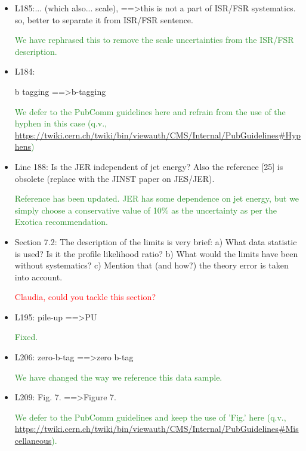 \documentclass[paper=a4, fontsize=11pt]{scrartcl}
\begin{document}
\begin{itemize}
\item L185:... (which also... scale), ==\textgreater this is not a part of ISR/FSR 
systematics. so, better to separate it from ISR/FSR sentence.

\textcolor{ForestGreen}{We have rephrased this to remove the scale uncertainties from the ISR/FSR description.}\\


\item L184: 

b tagging ==\textgreater b-tagging 

\textcolor{ForestGreen}{We defer to the PubComm guidelines here and refrain from the use of the hyphen
in this case (q.v., \url{https://twiki.cern.ch/twiki/bin/viewauth/CMS/Internal/PubGuidelines\#Hyphens})}\\


\item Line 188: 
Is the JER independent of jet energy? Also the reference [25] is obsolete 
(replace with the JINST paper on JES/JER). 

\textcolor{ForestGreen}{Reference has been updated. JER has some dependence on jet energy,
but we simply choose a conservative value of 10\% as the uncertainty as per the Exotica
recommendation.}\\

\item Section 7.2: 
The description of the limits is very brief: 
a) What data statistic is used? Is it the profile likelihood ratio? 
b) What would the limits have been without systematics? 
c) Mention that (and how?) the theory error is taken into account. 

\textcolor{Red}{Claudia, could you tackle this section?}\\

\item L195: 
pile-up ==\textgreater PU 

\textcolor{ForestGreen}{Fixed.}\\

\item L206: 
zero-b-tag ==\textgreater zero b-tag 

\textcolor{ForestGreen}{We have changed the way we reference this data sample.}\\


\item L209: 
Fig. 7. ==\textgreater Figure 7. 

\textcolor{ForestGreen}{We defer to the PubComm guidelines and keep the use of 'Fig.' here
(q.v., \url{https://twiki.cern.ch/twiki/bin/viewauth/CMS/Internal/PubGuidelines\#Miscellaneous}).}\\



\end{itemize}
\end{document}
